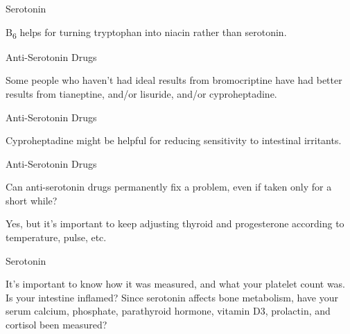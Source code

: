 \documentclass[11pt,oneside,openany,extrafontsizes]{memoir}
\begin{document}
\begin{standalonequote}{Serotonin}

    \begin{answer}
        B\textsubscript{6} helps for turning tryptophan into niacin rather than serotonin.
    \end{answer}
\end{standalonequote}

\begin{standalonequote}{Anti-Serotonin Drugs}

    \begin{answer}
        Some people who haven't had ideal results from bromocriptine have had better results from tianeptine, and/or lisuride, and/or cyproheptadine.
    \end{answer}
\end{standalonequote}

\begin{standalonequote}{Anti-Serotonin Drugs}

    \begin{answer}
        Cyproheptadine might be helpful for reducing sensitivity to intestinal irritants.
    \end{answer}
\end{standalonequote}

\begin{qaexchange}{Anti-Serotonin Drugs}

    \begin{question}
        Can anti-serotonin drugs permanently fix a problem, even if taken only for a short while?
    \end{question}

    \begin{answer}
        Yes, but it's important to keep adjusting thyroid and progesterone according to temperature, pulse, etc.
    \end{answer}
\end{qaexchange}

\begin{standalonequote}{Serotonin}

    \begin{answer}
        It's important to know how it was measured, and what your platelet count was. Is your intestine inflamed? Since serotonin affects bone metabolism, have your serum calcium, phosphate, parathyroid hormone, vitamin D3, prolactin, and cortisol been measured?
    \end{answer}
\end{standalonequote}
\end{document}
